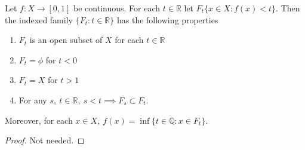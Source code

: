 \begin{lemma}
	Let \( f : X \to [0,1] \) be continuous.
	For each \( t \in \mathbb{R} \) let \( F_t  \{ x \in X : f(x) < t \} \).
	Then the indexed family \( \{F_t : t \in \mathbb{R} \} \) has the following properties
	\begin{enumerate}
		\item \( F_t \) is an open subset of \( X \) for each \( t \in \mathbb{R} \)
		\item \( F_t = \phi \) for \( t < 0 \)
		\item \( F_t = X \) for \( t > 1 \)
		\item For any \( s,\ t \in \mathbb{R},\ s < t \implies \overline{F_s} \subset F_t \).
	\end{enumerate}
	Moreover, for each \( x \in X,\ f(x) = \inf \{t \in \mathbb{Q} : x \in F_t \} \).
\end{lemma}
\begin{proof}
	Not needed.
\end{proof}

